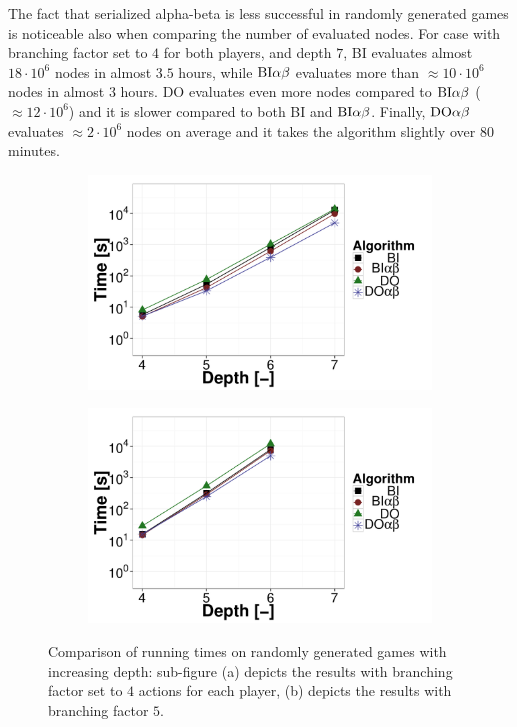The fact that serialized alpha-beta is less successful in randomly generated games is noticeable also when comparing the number of evaluated nodes.
For case with branching factor set to $4$ for both players, and depth $7$, \textsc{BI} evaluates almost $18\cdot10^6$ nodes in almost $3.5$ hours, while $\textrm{BI}\alpha\beta$ evaluates more than $\approx10\cdot10^6$ nodes in almost $3$ hours. 
\textsc{DO} evaluates even more nodes compared to $\textrm{BI}\alpha\beta$ ($\approx12\cdot10^6$) and it is slower compared to both \textsc{BI} and $\textrm{BI}\alpha\beta$. 
Finally, $\textrm{DO}\alpha\beta$ evaluates $\approx2\cdot10^6$ nodes on average and it takes the algorithm slightly over $80$ minutes.

\begin{figure}
\centering
	\begin{subfigure}{0.49\textwidth}
		\includegraphics[width=1\textwidth]{figures/RG-BF4-BIN-FALSE.pdf}\caption{}\label{fig:off:res:rgbf4}
	\end{subfigure}
	\begin{subfigure}{0.49\textwidth}
		\includegraphics[width=1\textwidth]{figures/RG-BF5-BIN-FALSE.pdf}\caption{}\label{fig:off:res:rgbf5}
	\end{subfigure}
\caption{Comparison of running times on randomly generated games with increasing depth: sub-figure (a) depicts the results with branching factor set to $4$ actions for each player, (b) depicts the results with branching factor $5$.} \label{fig:off:res:rg}
\end{figure}

